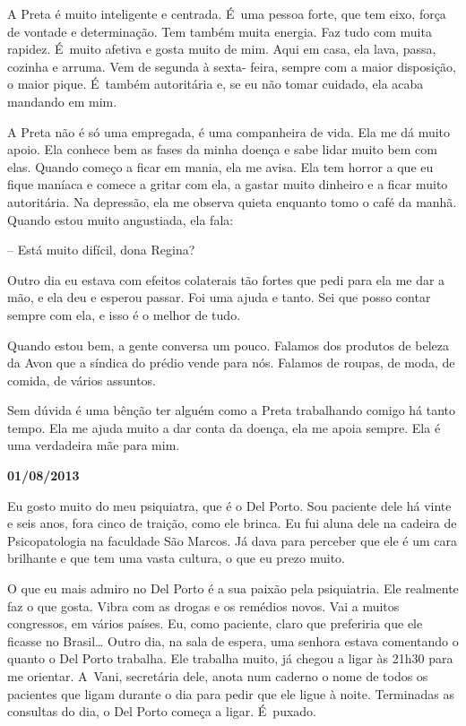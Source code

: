 A Preta é muito inteligente e centrada. É~uma pessoa forte, que tem
eixo, força de vontade e determinação. Tem também muita energia. Faz
tudo com muita rapidez. É~muito afetiva e gosta muito de mim. Aqui em
casa, ela lava, passa, cozinha e arruma. Vem de segunda à sexta- feira,
sempre com a maior disposição, o maior pique. É~também autoritária e, se
eu não tomar cuidado, ela acaba mandando em mim.

A Preta não é só uma empregada, é uma companheira de vida. Ela me dá
muito apoio. Ela conhece bem as fases da minha doença e sabe lidar muito
bem com elas. Quando começo a ficar em mania, ela me avisa. Ela tem
horror a que eu fique maníaca e comece a gritar com ela, a gastar muito
dinheiro e a ficar muito autoritária. Na depressão, ela me observa
quieta enquanto tomo o café da manhã. Quando estou muito angustiada, ela
fala:

-- Está muito difícil, dona Regina?

Outro dia eu estava com efeitos colaterais tão fortes que pedi para ela
me dar a mão, e ela deu e esperou passar. Foi uma ajuda e tanto. Sei que
posso contar sempre com ela, e isso é o melhor de tudo.

Quando estou bem, a gente conversa um pouco. Falamos dos produtos de
beleza da Avon que a síndica do prédio vende para nós. Falamos de
roupas, de moda, de comida, de vários assuntos.

Sem dúvida é uma bênção ter alguém como a Preta trabalhando comigo há
tanto tempo. Ela me ajuda muito a dar conta da doença, ela me apoia
sempre. Ela é uma verdadeira mãe para mim.

\begin{center}\asterisc{}\end{center}

\begin{flushright}\textbf{01/08/2013}\end{flushright}


Eu gosto muito do meu psiquiatra, que é o Del Porto. Sou paciente dele
há vinte e seis anos, fora cinco de traição, como ele brinca. Eu fui
aluna dele na cadeira de Psicopatologia na faculdade São Marcos. Já dava
para perceber que ele é um cara brilhante e que tem uma vasta cultura, o
que eu prezo muito.

O que eu mais admiro no Del Porto é a sua paixão pela psiquiatria. Ele
realmente faz o que gosta. Vibra com as drogas e os remédios novos. Vai
a muitos congressos, em vários países. Eu, como paciente, claro que
preferiria que ele ficasse no Brasil… Outro dia, na sala de
espera, uma senhora estava comentando o quanto o Del Porto trabalha. Ele
trabalha muito, já chegou a ligar às 21h30 para me orientar. A~Vani,
secretária dele, anota num caderno o nome de todos os pacientes que
ligam durante o dia para pedir que ele ligue à noite. Terminadas as
consultas do dia, o Del Porto começa a ligar. É~puxado.

